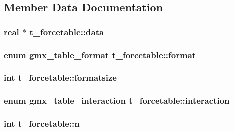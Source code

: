 \subsection{\-Member \-Data \-Documentation}
\hypertarget{structt__forcetable_a80eead30934f1822dc387f6de89390d9}{
\subsubsection[{data}]{\setlength{\rightskip}{0pt plus 5cm}real $\ast$ {\bf t\-\_\-forcetable\-::data}}}\label{structt__forcetable_a80eead30934f1822dc387f6de89390d9}
\hypertarget{structt__forcetable_a4a703e6575e55948b2ae0dbcddaa0f5c}{
\subsubsection[{format}]{\setlength{\rightskip}{0pt plus 5cm}enum {\bf gmx\-\_\-table\-\_\-format} {\bf t\-\_\-forcetable\-::format}}}\label{structt__forcetable_a4a703e6575e55948b2ae0dbcddaa0f5c}
\hypertarget{structt__forcetable_ab6dd1173c15ab98586af99e29859161a}{
\subsubsection[{formatsize}]{\setlength{\rightskip}{0pt plus 5cm}int {\bf t\-\_\-forcetable\-::formatsize}}}\label{structt__forcetable_ab6dd1173c15ab98586af99e29859161a}
\hypertarget{structt__forcetable_a99f19dbd86d595a6a6fde0f8e4c7c314}{
\subsubsection[{interaction}]{\setlength{\rightskip}{0pt plus 5cm}enum {\bf gmx\-\_\-table\-\_\-interaction} {\bf t\-\_\-forcetable\-::interaction}}}\label{structt__forcetable_a99f19dbd86d595a6a6fde0f8e4c7c314}
\hypertarget{structt__forcetable_a15b22391b981e3958f382bd5cdb05133}{
\subsubsection[{n}]{\setlength{\rightskip}{0pt plus 5cm}int {\bf t\-\_\-forcetable\-::n}}}\label{structt__forcetable_a15b22391b981e3958f382bd5cdb05133}

